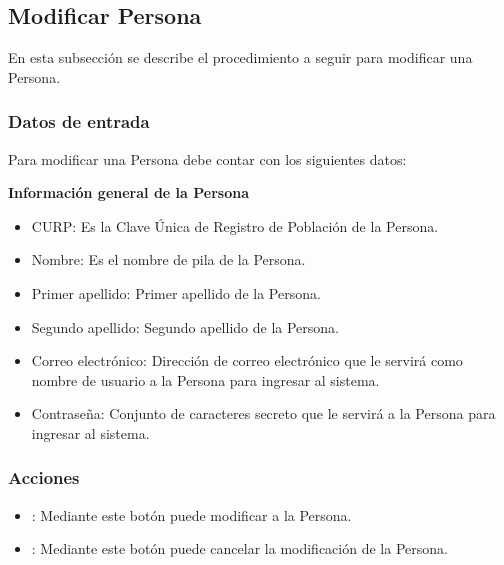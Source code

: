 \subsection{Modificar Persona}

En esta subsección se describe el procedimiento a seguir para modificar una Persona.


\subsubsection{Datos de entrada}
\begin{description}
	\item Para modificar una Persona debe contar con los siguientes datos: \hspace{10pt}
	
	\begin{description}
	    \item \textbf{Información general de la Persona}
	    \begin{itemize}
		  \item CURP: Es la Clave Única de Registro de Población de la Persona.
		  \item Nombre: Es el nombre de pila de la Persona.
		  \item Primer apellido: Primer apellido de la Persona.
		  \item Segundo apellido: Segundo apellido de la Persona.
		  \item Correo electrónico: Dirección de correo electrónico que le servirá como nombre de usuario a la Persona para ingresar al sistema.
		  \item Contraseña: Conjunto de caracteres secreto que le servirá a la Persona para ingresar al sistema.
	    \end{itemize}
	 \end{description}
\end{description}

\subsubsection{Acciones}
\begin{itemize}
  \item {}: Mediante este botón puede modificar a la Persona.
  \item {}: Mediante este botón puede cancelar la modificación de la Persona.
\end{itemize}


